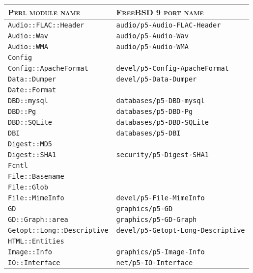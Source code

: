 \begin{table}
	\centering
	\begin{tabular}{|p{15em}|p{18em}|}
		\hline
		\textsc{Perl module name} 						&  \textsc{FreeBSD 9 port name}\\
		\hline
		\hline
		\verb|Audio::FLAC::Header| 						& \verb|audio/p5-Audio-FLAC-Header| \\
		\hline
		\verb|Audio::Wav| 										& \verb|audio/p5-Audio-Wav| \\
		\hline
		\verb|Audio::WMA| 										& \verb|audio/p5-Audio-WMA| \\
		\hline
		\verb|Config| 												& \\
		\hline
		\verb|Config::ApacheFormat|						& \verb|devel/p5-Config-ApacheFormat| \\
		\hline
		\verb|Data::Dumper| 									& \verb|devel/p5-Data-Dumper| \\
		\hline
		\verb|Date::Format| 									&	\\
		\hline
		\verb|DBD::mysql|											& \verb|databases/p5-DBD-mysql| \\
		\hline
		\verb|DBD::Pg|												& \verb|databases/p5-DBD-Pg| \\
		\hline
		\verb|DBD::SQLite|										& \verb|databases/p5-DBD-SQLite| \\
		\hline
		\verb|DBI|														& \verb|databases/p5-DBI| \\
		\hline
		\verb|Digest::MD5| 										& \\
		\hline
		\verb|Digest::SHA1| 									& \verb|security/p5-Digest-SHA1| \\
		\hline
		\verb|Fcntl| 													& \\
		\hline
		\verb|File::Basename| 								& \\
		\hline
		\verb|File::Glob| 										& \\
		\hline
		\verb|File::MimeInfo| 								& \verb|devel/p5-File-MimeInfo| \\
		\hline
		\verb|GD| 														& \verb|graphics/p5-GD| \\
		\hline
		\verb|GD::Graph::area| 								& \verb|graphics/p5-GD-Graph| \\
		\hline
		\verb|Getopt::Long::Descriptive| 			& \verb|devel/p5-Getopt-Long-Descriptive| \\
		\hline
		\verb|HTML::Entities|									& \\
		\hline
		\verb|Image::Info| 										& \verb|graphics/p5-Image-Info| \\
		\hline
		\verb|IO::Interface| 									& \verb|net/p5-IO-Interface| \\

\end{tabular}
\end{table}
